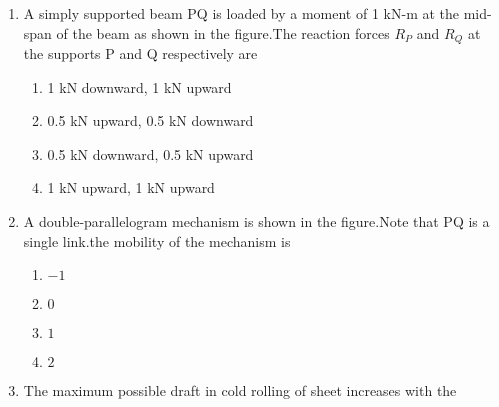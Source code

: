 \documentclass[journal]{IEEEtran}
\begin{document}
\begin{enumerate}
        \item A simply supported beam PQ is loaded by a moment of 1 kN-m at the mid-span of the beam as shown in the figure.The reaction forces $R_{P}$ and $R_{Q}$ at the supports P and Q respectively are

      \begin{figure}[H]
        \centering
    \end{figure}
       




    \begin{multicols}{2}

        \begin{enumerate}
    \item 1 kN downward, 1 kN upward
    \item 0.5 kN upward, 0.5 kN downward
    \item 0.5 kN downward, 0.5 kN upward
    \item 1 kN upward, 1 kN upward

     \end{enumerate}
         \end{multicols}

     \item A double-parallelogram mechanism is shown in the figure.Note that PQ is a single link.the mobility of the mechanism is

      \begin{figure}[H]
        \centering
    \end{figure}
       



    \begin{multicols}{2}

         \begin{enumerate}
             \item $-1$
             \item $0$
             \item $1$
             \item $2$

\end{enumerate}
    \end{multicols}

     \item The maximum possible draft in cold rolling of sheet increases with the
         \begin{multicols}{2}


\end{multicols}
\end{enumerate}
\end{document}
